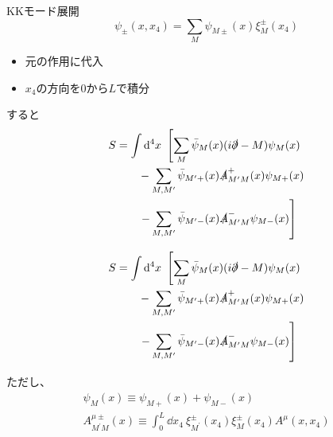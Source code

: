 \documentclass[
  unicode,a4paper,10pt,
  xcolor = {dvipsnames,svgnames},
  hyperref ={colorlinks=true,citecolor=Navy,linkcolor=NavyBlue,urlcolor=purple},
  ja=standard,lualatex
]{beamer}
\begin{document}
\begin{frame}  

  KKモード展開
  \begin{equation}
    \psi_{\pm}(x,x_{4})
    =
    \sum_{M}
    \psi_{M\pm}(x)\xi^{\pm}_{M}(x_{4})
    \nonumber
  \end{equation}
  \begin{itemize}
    \item 
    元の作用に代入
    \item 
    $x_{4}$の方向を$0$から$L$で積分
  \end{itemize}
  すると
  \begin{align}
    S
    &=
    \int\dd^4 x\ 
    \left[  
      \sum_{M}\bar{\psi}_{M}(x)(i\slashed{\partial}-M)\psi_{M}(x)
    \right.
    \nonumber
    \\
    &\qquad
    -
    \sum_{M,M^{\prime}}\bar{\psi}_{M^{\prime}+}(x)\slashed{A}^{+}_{M^{\prime}M}(x)\psi_{M+}(x)
    \nonumber
    \\
    &\qquad
    \left.
    -\sum_{M,M^{\prime}}\bar{\psi}_{M^{\prime}-}(x)\slashed{A}^{-}_{M^{\prime}M}\psi_{M-}(x)
    \right]
    \nonumber
  \end{align}

\end{frame}


\begin{frame}

  \begin{align}
    S
    &=
    \int\dd^4 x\ 
    \left[  
      \sum_{M}\bar{\psi}_{M}(x)(i\slashed{\partial}-M)\psi_{M}(x)
    \right.
    \nonumber
    \\
    &\qquad
    -
    \sum_{M,M^{\prime}}\bar{\psi}_{M^{\prime}+}(x)\slashed{A}^{+}_{M^{\prime}M}(x)\psi_{M+}(x)
    \nonumber
    \\
    &\qquad
    \left.
    -\sum_{M,M^{\prime}}\bar{\psi}_{M^{\prime}-}(x)\slashed{A}^{-}_{M^{\prime}M}\psi_{M-}(x)
    \right]
    \nonumber
  \end{align}

  ただし、
  \begin{gather}
    \psi_{M}(x)
    \equiv
    \psi_{M+}(x)
    +
    \psi_{M-}(x)
    \nonumber
    \\
    A_{M^{\prime}M}^{\mu\pm}(x)
    \equiv
    \int_{0}^{L}
    \dd x_{4}\ 
    \xi_{M^{\prime}}^{\pm}(x_{4})\xi_{M}^{\pm}(x_{4})A^{\mu}(x,x_{4})
    \nonumber
  \end{gather}
  
\end{frame}
\end{document}
